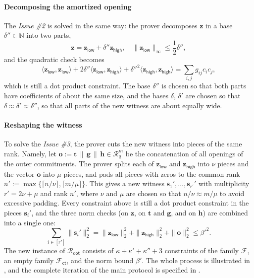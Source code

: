 \documentclass[../../book.tex]{subfiles}
\begin{document}
\paragraph{Decomposing the amortized opening}
The \textit{Issue \#2} is solved in the same way: the prover decomposes $\mathbf{z}$ in a base $\delta'' \in \mathbb{N}$ into two parts,
\begin{equation*}
    \mathbf{z} = \mathbf{z}_{\mathsf{low}} + \delta''\mathbf{z}_{\mathsf{high}}, \quad \|\mathbf{z}_{\mathsf{low}}\|_{\infty} \leq \frac{1}{2}\delta'',
\end{equation*}
and the quadratic check becomes
\begin{equation*}
    \langle \mathbf{z}_{\mathsf{low}}, \mathbf{z}_{\mathsf{low}} \rangle + 2\delta''\langle \mathbf{z}_{\mathsf{low}}, \mathbf{z}_{\mathsf{high}} \rangle + \delta''^2\langle \mathbf{z}_{\mathsf{high}}, \mathbf{z}_{\mathsf{high}} \rangle = \sum_{i,j} g_{ij}c_ic_j,
\end{equation*}
which is still a dot product constraint.
The base $\delta''$ is chosen so that both parts have coefficients of about the same size, and the bases $\delta$, $\delta'$ are chosen so that $\delta \approx \delta' \approx \delta''$, so that all parts of the new witness are about equally wide.

\paragraph{Reshaping the witness}
To solve the \textit{Issue \#3}, the prover cuts the new witness into pieces of the same rank.
Namely, let $\mathbf{o} := \mathbf{t}\,\|\,\mathbf{g}\,\|\,\mathbf{h} \in \mathcal{R}_q^m$ be the concatenation of all openings of the outer commitments.
The prover splits each of $\mathbf{z}_{\mathsf{low}}$ and $\mathbf{z}_{\mathsf{high}}$ into $\nu$ pieces and the vector $\mathbf{o}$ into $\mu$ pieces, and pads all pieces with zeros to the common rank $n' := \max\{\lceil n/\nu \rceil, \lceil m/\mu \rceil\}$.
This gives a new witness $\mathbf{s}_1', \dots, \mathbf{s}_{r'}'$ with multiplicity $r' = 2\nu + \mu$ and rank $n'$, where $\nu$ and $\mu$ are chosen so that $n/\nu \approx m/\mu$ to avoid excessive padding.
Every constraint above is still a dot product constraint in the pieces $\mathbf{s}_i'$, and the three norm checks (on $\mathbf{z}$, on $\mathbf{t}$ and $\mathbf{g}$, and on $\mathbf{h}$) are combined into a single one:
\begin{equation*}
    \sum_{i \in [r']} \|\mathbf{s}_i'\|_2^2 = \|\mathbf{z}_{\mathsf{low}}\|_2^2 + \|\mathbf{z}_{\mathsf{high}}\|_2^2 + \|\mathbf{o}\|_2^2 \leq \beta'^2.
\end{equation*}
The new instance of $\mathcal{R}_{\mathsf{dot}}$ consists of $\kappa + \kappa' + \kappa'' + 3$ constraints of the family $\mathcal{F}$, an empty family $\mathcal{F}_{\mathsf{ct}}$, and the norm bound $\beta'$.
The whole process is illustrated in , and the complete iteration of the main protocol is specified in .
\end{document}
